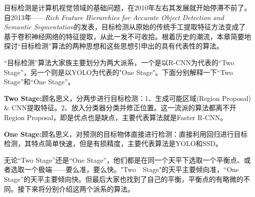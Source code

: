 目标检测是计算机视觉领域的基础问题，在2010年左右其发展就开始停滞不前了。自2013年——\textit{Rich Feature Hierarchies for Accurate Object Detection and Semantic Segmentation}\cite{rcnn}的发表，目标检测从原始的传统手工提取特征方法变成了基于卷积神经网络的特征提取，从此一发不可收拾。根着历史的潮流，本章简要地探讨“目标检测”算法的两种思想和这些思想引申出的具有代表性的算法。

“目标检测”算法大家族主要划分为两大派系，一个是以R-CNN为代表的“Two Stage”，另一个则是以YOLO为代表的"One Stage"。下面分别解释一下“Two Stage”和“One Stage”。

\textbf{Two Stage:}顾名思义，分两步进行目标检测：1、生成可能区域(Region Proposal) \& CNN提取特征。2、放入分类器分类并修正位置。这一流派的算法都离不开Region Proposal，即是优点也是缺点，主要代表算法就是Faster R-CNN。

\textbf{One Stage:}顾名思义，对预测的目标物体直接进行检测：直接利用回归进行目标检测，其特点简单快速，但是有损精度，主要代表算法是YOLO和SSD。

无论“Two Stage”还是“One Stage”，他们都是在同一个天平下选取一个平衡点、或者选取一个极端——要么准，要么快。"Two　Stage"的天平主要倾向准，“One Stage”的天平主要倾向快。但最后大家也找到了自己的平衡，平衡点的有略微的不同。接下来将分别介绍这两个派系的算法。

